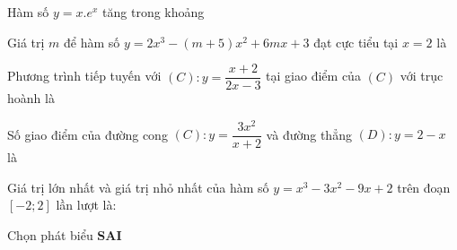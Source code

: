 \begin{question}%
Hàm số $y=x.e^x$ tăng trong khoảng
\datcot
\bonpa
{}
{}
{}
{}
\end{question}

\begin{question}%
Giá trị $m$ để hàm số $y=2x^3-(m+5)x^2+6mx+3$ đạt cực tiểu tại $x=2$ là
\datcot
\bonpa
{}
{}
{}
{}
\end{question}

\begin{question}%
Phương trình tiếp tuyến với $(C): y=\dfrac{x+2}{2x-3}$ tại giao điểm của $(C)$ với trục hoành là
\datcot
\bonpa
{}
{}
{}
{}
\end{question}

\begin{question}%
Số giao điểm của đường cong $(C): y=\dfrac{3x^2}{x+2}$ và đường thẳng $(D): y=2-x$ là
\datcot
\bonpa
{}
{}
{}
{}
\end{question}

\begin{question}%
Giá trị lớn nhất và giá trị nhỏ nhất của hàm số $y=x^3-3x^2-9x+2$ trên đoạn $\left[-2; 2\right]$ lần lượt là:
\datcot
\bonpa
{}
{}
{}
{}
\end{question}

\begin{question}%
Chọn phát biểu \textbf{SAI}
\datcot[4]
\bonpa
{}
{}
{}
{}
\end{question}

